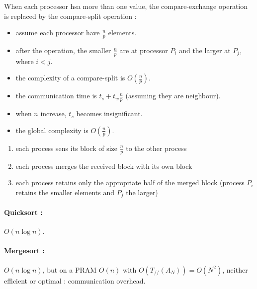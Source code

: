 \documentclass[11pt,a4paper]{report}
\begin{document}
When each processor hsa more than one value, the compare-exchange operation is replaced by the compare-split operation :

\begin{itemize}
    \item assume each processor have $\frac{n}{p}$ elements.
    \item after the operation, the smaller $\frac{n}{p}$ are at processor $P_i$ and the larger at $P_j$, where $i < j$.
    \item the complexity of a compare-split is $O(\frac{n}{p})$.
    \item the communication time is $t_s + t_w \frac{n}{p}$ (assuming they are neighbour).
    \item when $n$ increase, $t_s$ becomes insignificant.
    \item the global complexity is $O(\frac{n}{p})$.
\end{itemize}

\begin{enumerate}
    \item each process sens its block of size $\frac{n}{p}$ to the other process
    \item each process merges the received block with its own block
    \item each process retains only the appropriate half of the merged block (process $P_i$ retains the smaller elements and $P_j$ the larger)
\end{enumerate}

\paragraph*{Quicksort :} $O(n \log n)$.

\paragraph*{Mergesort :} $O(n \log n)$, but on a PRAM $O(n)$ with $O(T_{//}(A_N)) = O(N^2)$, neither efficient or optimal : communication overhead.


\end{document}
